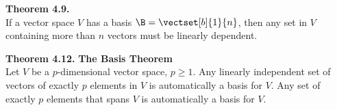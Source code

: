 \newpage



\begin{boxthm}
	\textbf{Theorem 4.9.} \\
	If a vector space $V$ has a basis $\B=\vectset[b]{1}{n}$, then any set in $V$ containing more than $n$ vectors must be linearly dependent.
\end{boxthm}
\vspace{-1em}
\begin{boxthm}
	\textbf{Theorem 4.12.}
	\textbf{The Basis Theorem} \\
	Let $V$ be a $p$-dimensional vector space, $p\geq 1$. Any linearly independent set of vectors of exactly $p$ elements in $V$ is automatically a basis for $V$. Any set of exactly $p$ elements that spans $V$ is automatically a basis for $V$.
\end{boxthm}


